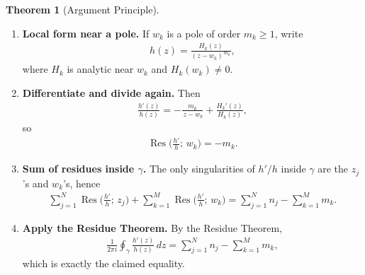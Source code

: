 \documentclass[12pt]{article}
\theoremstyle{definition} %
\newtheorem{theorem}{Theorem}
\theoremstyle{plain} %
\begin{document}
\begin{theorem}[Argument Principle]
\begin{enumerate}
        \item\textbf{Local form near a pole.}  
        If $w_k$ is a pole of order $m_k\ge1$, write
        \begin{align}
            h(z)=\frac{H_k(z)}{(z-w_k)^{\,m_k}},
        \end{align}
        where $H_k$ is analytic near $w_k$ and $H_k(w_k)\neq0$.
        
        \item\textbf{Differentiate and divide again.}  
        Then
        \begin{align}
            \frac{h'(z)}{h(z)}
            =
            -\frac{m_k}{\,z-w_k}+\frac{H_k'(z)}{H_k(z)},
        \end{align}
        so
        \begin{align}
            \operatorname*{Res}\!\bigl(\tfrac{h'}{h};\,w_k\bigr)=-m_k.
        \end{align}
        
        \item\textbf{Sum of residues inside $\gamma$.}  
        The only singularities of $h'/h$ inside $\gamma$ are the $z_j$’s and $w_k$’s, hence
        \begin{align}
            \sum_{j=1}^{N}\operatorname*{Res}\!\bigl(\tfrac{h'}{h};\,z_j\bigr)
            +
            \sum_{k=1}^{M}\operatorname*{Res}\!\bigl(\tfrac{h'}{h};\,w_k\bigr)
            =
            \sum_{j=1}^{N}n_j
            -
            \sum_{k=1}^{M}m_k.
        \end{align}
        
        \item\textbf{Apply the Residue Theorem.}  
        By the Residue Theorem,
        \begin{align}
            \frac{1}{2\pi i}\oint_{\gamma}\frac{h'(z)}{h(z)}\,dz
            =
            \sum_{j=1}^{N}n_j
            -
            \sum_{k=1}^{M}m_k,
        \end{align}
        which is exactly the claimed equality.
    \end{enumerate}
\end{theorem}
\end{document}
